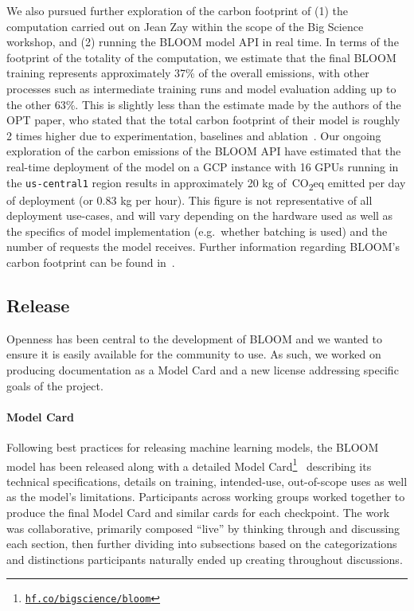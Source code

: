 \documentclass[twoside,11pt]{article}
\newcommand{\carboneq}{CO\textsubscript{2}eq}
\begin{document}
We also pursued further exploration of the carbon footprint of (1) the computation carried out on Jean Zay within the scope of the Big Science workshop, and (2) running the BLOOM model API in real time. In terms of the footprint of the totality of the computation, we estimate that the final BLOOM training represents approximately 37\% of the overall emissions, with other processes such as intermediate training runs and model evaluation adding up to the other 63\%. This is slightly less than the estimate made by the authors of the OPT paper, who stated that the total carbon footprint of their model is roughly 2 times higher due to experimentation, baselines and ablation~\citep{zhang2022opt}. Our ongoing exploration of the carbon emissions of the BLOOM API have estimated that the real-time deployment of the model on a GCP instance with 16 GPUs running in the \texttt{us-central1} region results in approximately 20 kg of~\carboneq{} emitted per day of deployment (or 0.83 kg per hour). This figure is not representative of all deployment use-cases, and will vary depending on the hardware used as well as the specifics of model implementation (e.g.\ whether batching is used) and the number of requests the model receives. Further information regarding BLOOM's carbon footprint can be found in~\cite{luccioni2022estimating}.

\subsection{Release}

Openness has been central to the development of BLOOM and we wanted to ensure it is easily available for the community to use. As such, we worked on producing documentation as a Model Card \citep{ModelCard} and a new license addressing specific goals of the project.

\paragraph{Model Card}
Following best practices for releasing machine learning models, the BLOOM model has been released along with a detailed Model Card\footnote{\href{https://hf.co/bigscience/bloom}{\texttt{hf.co/bigscience/bloom}}}~\citep{ModelCard} describing its technical specifications, details on training, intended-use, out-of-scope uses as well as the model's limitations.
Participants across working groups worked together to produce the final Model Card and similar cards for each checkpoint. The work was collaborative, primarily composed ``live'' by thinking through and discussing each section, then further dividing into subsections based on the categorizations and distinctions participants naturally ended up creating throughout discussions.
\end{document}
